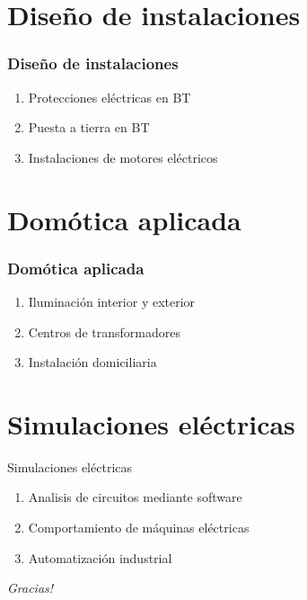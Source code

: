 \documentclass[xcolor=dvipsnames,envcountsect]{beamer}
\begin{document}
\section{Diseño de instalaciones}
\begin{frame}
	\frametitle{Diseño de instalaciones}
		\justifying
		\begin{enumerate}
			\item Protecciones eléctricas en BT
			\item Puesta a tierra en BT
			\item Instalaciones de motores eléctricos
		\end{enumerate}
\end{frame}



\section{Domótica aplicada}

\begin{frame}
		\frametitle{Domótica aplicada}
		\begin{enumerate}
			\item Iluminación interior y exterior
			\item Centros de transformadores
			\item Instalación domiciliaria
		\end{enumerate}				
\end{frame}


\section{Simulaciones eléctricas}
\begin{frame}{Simulaciones eléctricas}
		\begin{enumerate}
			\item Analisis de circuitos mediante software
			\item Comportamiento de máquinas eléctricas
			\item Automatización industrial 
		\end{enumerate}		
\end{frame}





	\begin{frame}
		\centering
		\begin{block}
			\scshape
				\begin{center}
					\Huge\emph{Gracias!}
				\end{center}
		\end{block}
	\end{frame}
\end{document}
